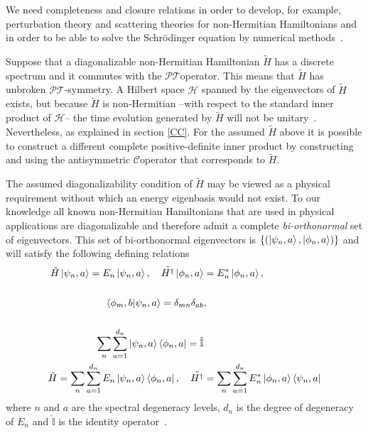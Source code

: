 \documentclass[12pt, a4paper]{report}
\newcommand\PT{\(\mathcal{PT}\)}
\newcommand\CC{\(\mathcal{C}\)}
\begin{document}
We need completeness and closure relations in order to develop, for example, perturbation theory and scattering theories for non-Hermitian Hamiltonians and in order to be able to solve the Schrödinger equation by numerical methods~\cite{Moiseyev}.

Suppose that a diagonalizable non-Hermitian Hamiltonian $\tilde{H}$ has a discrete spectrum and it commutes with the \PT\:operator. This means that  $\tilde{H}$ has unbroken \PT-symmetry. A Hilbert space $\mathcal{H}$ spanned by the eigenvectors of $\tilde{H}$ exists, but because $\tilde{H}$ is non-Hermitian --with respect to the standard inner product of $\mathcal{H}$-- the time evolution generated by $\tilde{H}$ will not be unitary~\cite{Mostafazadeh}. Nevertheless, as explained in section \ref{CC}. For the assumed $\tilde{H}$ above it is possible to construct a different complete positive-definite inner product by constructing and using the antisymmetric \CC\:operator that corresponds to $\tilde{H}$.

The assumed diagonalizability condition of $\tilde{H}$ may be viewed as a physical requirement without which an energy eigenbasis would not exist. To our knowledge all known non-Hermitian Hamiltonians that are used in physical applications are diagonalizable and therefore admit a complete \emph{bi-orthonormal} set of eigenvectors. This set of bi-orthonormal eigenvectors is $\{(\ket{\psi_{n}, a}, \ket{\phi_{n}, a})\}$ and will satisfy the following defining relations~\cite{Pseudo-HermiticityIII}
\begin{align}
\tilde{H}\ket{\psi_{n}, a} = E_{n}\ket{\psi_{n}, a},\quad\tilde{H^{\dagger}}\ket{\phi_{n}, a} &= E^{*}_{n}\ket{\phi_{n}, a},\\
\nonumber\\
\braket{\phi_{m}, b|\psi_{n}, a} = \delta_{mn}\delta_{ab}&,\\
\nonumber\\
\sum^{}_{n}\sum_{a=1}^{d_n}\ket{\psi_{n}, a}\bra{\phi_{n}, a} = \hat{\mathbb{I}}&\\
\tilde{H} = \sum^{}_{n}\sum_{a=1}^{d_n}E_{n}\ket{\psi_{n}, a}\bra{\phi_{n}, a},\quad\tilde{H^{\dagger}} &= \sum^{}_{n}\sum_{a=1}^{d_n}E_{n}^{*}\ket{\phi_{n}, a}\bra{\psi_{n}, a}
\end{align}
where $n$ and $a$ are the spectral degeneracy levels, $d_n$ is the degree of degeneracy of $E_n$ and $\hat{\mathbb{I}}$ is the identity operator~\cite{Pseudo-HermiticityIII}.

\end{document}
